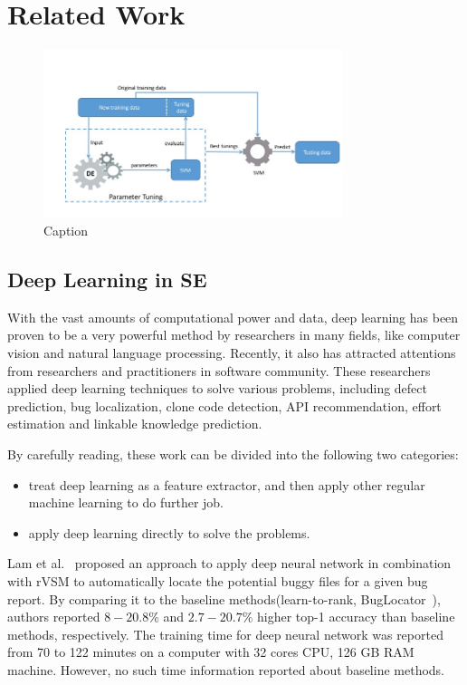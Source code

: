 \section{Related Work}
\begin{figure}
    \centering
    \includegraphics[width=3.45in]{pic/workflow.jpg}
    \caption{Caption}
    \label{fig:my_label}
\end{figure}

\subsection{Deep Learning in SE}
With the vast amounts of computational power and data, 
deep learning has been proven to be a very powerful method 
by researchers in many fields\cite{lecun2015deep}, like computer vision and natural language processing\cite{krizhevsky2012imagenet,mikolov2013distributed,sutskever2014sequence}. 
Recently, it also has attracted  attentions from researchers and practitioners in software
 community\cite{wang2016automatically, gu2016deep, xu2016predicting,white2016deep,white2015toward,lam2015combining,choetkiertikul2016deep}.
 These researchers applied  deep learning techniques to solve various problems,
 including defect prediction, bug localization, clone code detection, API recommendation, 
 effort estimation and linkable knowledge prediction.
 
By carefully reading, these work can be divided into the following two categories:
 
\begin{itemize}
\item treat deep learning as a feature extractor, and then apply other regular machine learning to do further job.
\item apply deep learning directly to solve the problems.
\end{itemize}

Lam et al.~\cite{lam2015combining}  proposed an approach to apply deep neural network
 in combination with rVSM to automatically locate the potential buggy files for a given
 bug report. By comparing it to the baseline methods(learn-to-rank\cite{ye2014learning}, 
 BugLocator~\cite{zhou2012should}), authors reported $8-20.8\%$  and $2.7-20.7\%$ 
 higher top-1 accuracy than baseline methods, respectively. The training time for deep neural
 network was reported from 70 to 122 minutes on a computer with 32 cores CPU,
 126 GB RAM machine. However,
 no such time information reported about baseline methods.
 
